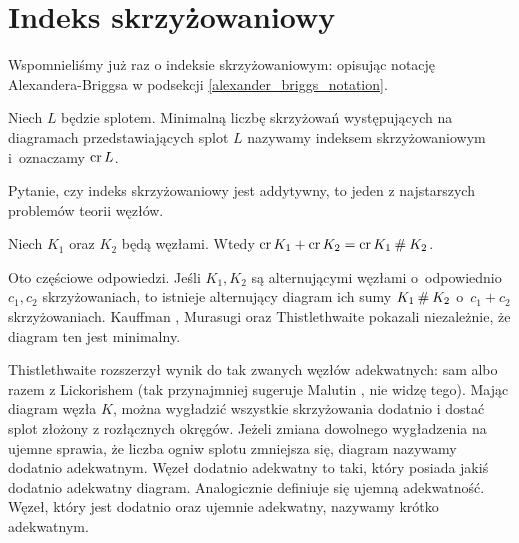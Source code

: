 
\section{Indeks skrzyżowaniowy}
Wspomnieliśmy już raz o indeksie skrzyżowaniowym: opisując notację Alexandera-Briggsa w podsekcji \ref{alexander_briggs_notation}.

%
\begin{definition}
    Niech $L$ będzie splotem.
    Minimalną liczbę skrzyżowań występujących na diagramach przedstawiających splot $L$ nazywamy indeksem skrzyżowaniowym i~oznaczamy $\operatorname{cr} L$.
\end{definition}

Pytanie, czy indeks skrzyżowaniowy jest addytywny, to jeden z najstarszych problemów teorii węzłów.

\begin{conjecture}
%
%
\label{con:crossing_additive}%
    Niech $K_1$ oraz $K_2$ będą węzłami.
    Wtedy $\operatorname{cr} K_1 + \operatorname{cr} K_2 = \operatorname{cr} K_1 \mathbin{\#} K_2$.
\end{conjecture}

Oto częściowe odpowiedzi.
Jeśli $K_1, K_2$ są alternującymi węzłami o~odpowiednio $c_1, c_2$ skrzyżowaniach, to istnieje alternujący diagram ich sumy $K_1 \mathbin{\#} K_2$ o~$c_1 + c_2$ skrzyżowaniach.
%
Kauffman \cite[twierdzenie 2.10]{kauffman1987}, Murasugi \cite[wniosek 6]{murasugi1987} oraz Thistlethwaite \cite[wniosek 1]{thistlethwaite1987} pokazali niezależnie, że diagram ten jest minimalny.
%
%
%

Thistlethwaite rozszerzył wynik do tak zwanych węzłów adekwatnych: sam \cite{thistlethwaite1988} albo razem z Lickorishem \cite{lickorish1988} (tak przynajmniej sugeruje Malutin \cite[s. 3]{malyutin2016}, nie widzę tego).
%
%
%
Mając diagram węzła $K$, można wygładzić wszystkie skrzyżowania dodatnio i dostać splot złożony z rozłącznych okręgów.
Jeżeli zmiana dowolnego wygładzenia na ujemne sprawia, że liczba ogniw splotu zmniejsza się, diagram nazywamy dodatnio adekwatnym.
Węzeł dodatnio adekwatny to taki, który posiada jakiś dodatnio adekwatny diagram.
Analogicznie definiuje się ujemną adekwatność.
Węzeł, który jest dodatnio oraz ujemnie adekwatny, nazywamy krótko adekwatnym.

